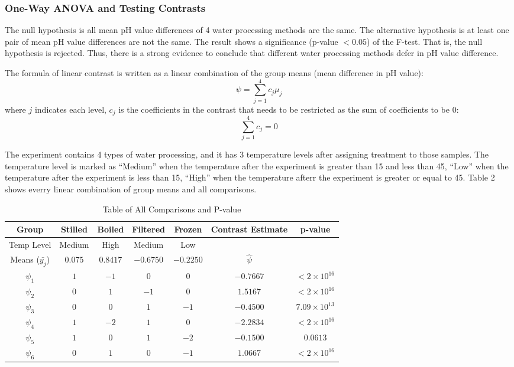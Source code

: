 \documentclass[12pt,]{article}
\begin{document}
\hypertarget{one-way-anova-and-testing-contrasts}{%
\subsubsection{One-Way ANOVA and Testing
Contrasts}\label{one-way-anova-and-testing-contrasts}}

The null hypothesis is all mean pH value differences of 4 water
processing methods are the same. The alternative hypothesis is at least
one pair of mean pH value differences are not the same. The result shows
a significance (p-value \(<0.05\)) of the F-test. That is, the null
hypothesis is rejected. Thus, there is a strong evidence to conclude
that different water processing methods defer in pH value difference.

The formula of linear contrast is written as a linear combination of the
group means (mean difference in pH value): \[\psi=\sum_{j=1}^4c_j\mu_j\]
where \(j\) indicates each level, \(c_j\) is the coefficients in the
contrast that needs to be restricted as the sum of coefficients to be
\(0\): \[\sum_{j=1}^4c_j=0\]

The experiment contains 4 types of water processing, and it has 3
temperature levels after assigning treatment to those samples. The
temperature level is marked as ``Medium'' when the temperature after the
experiment is greater than 15 and less than 45, ``Low'' when the
temperature after the experiment is less than 15, ``High'' when the
temperature afterr the experiment is greater or equal to 45. Table 2
shows everry linear combination of group means and all comparisons.

\begin{table}[H]
\caption{Table of All Comparisons and P-value}
\vspace{5pt}
\centering
\begin{tabular}{ |c||c|c|c|c||c|c|  }
 \hline
 Group & Stilled & Boiled & Filtered & Frozen & Contrast Estimate & p-value\\
 \hline
 Temp Level & Medium & High & Medium & Low & & \\
 Means ($\bar{y_j}$) & $0.075$ & $0.8417$ & $-0.6750$ & $-0.2250$ & $\hat{\psi}$ & \\
 \hline
 $\psi_1$ & $1$ & $-1$ & $0$ & $0$ & $-0.7667$ & $<2\times 10^{16}$\\
 $\psi_2$ & $0$ & $1$ & $-1$ & $0$ & $1.5167$ & $<2\times 10^{16}$\\
 $\psi_3$ & $0$ & $0$ & $1$ & $-1$ & $-0.4500$ & $7.09\times 10^{13}$\\
 $\psi_4$ & $1$ & $-2$ & $1$ & $0$ & $-2.2834$ & $<2\times 10^{16}$\\
 $\psi_5$ & $1$ & $0$ & $1$ & $-2$ & $-0.1500$ & $0.0613$\\
 $\psi_6$ & $0$ & $1$ & $0$ & $-1$ & $1.0667$ & $<2\times 10^{16}$\\
 \hline
\end{tabular}
\end{table}
\end{document}
